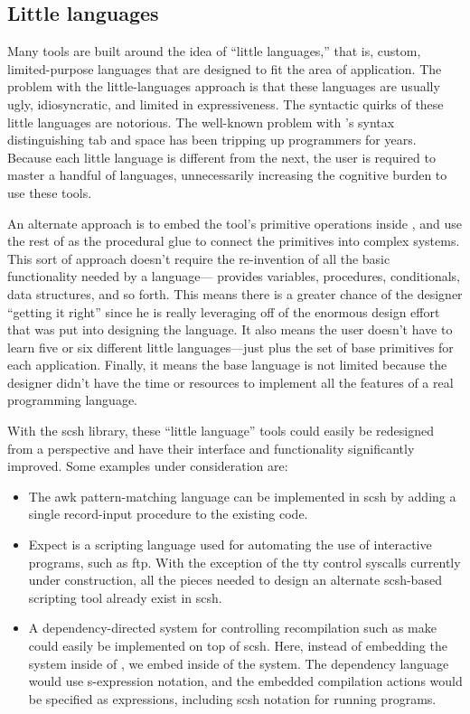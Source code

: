 \subsection{Little languages}
Many {\Unix} tools are built around the idea of ``little languages,'' that is,
custom, limited-purpose languages that are designed to fit the area of
application.  The problem with the little-languages approach is that these
languages are usually ugly, idiosyncratic, and limited in expressiveness.
The syntactic quirks of these little languages are notorious. 
The well-known problem with 's syntax distinguishing tab and
space has been tripping up programmers for years.
Because each little language is different
from the next, the user is required to master a handful of languages,
unnecessarily increasing the cognitive burden to use these tools.

An alternate approach is to embed the tool's primitive operations inside
{\Scheme},
and use the rest of {\Scheme} as the procedural glue to connect the
primitives into complex systems.  This sort of approach doesn't require the
re-invention of all the basic functionality needed by a language---{\Scheme}
provides variables, procedures, conditionals, data structures, and so
forth. This means there is a greater chance of the designer ``getting it
right'' since he is really leveraging off of the enormous design effort that
was put into designing the {\Scheme} language. It also means the user doesn't
have to learn five or six different little languages---just {\Scheme} plus the
set of base primitives for each application. Finally, it means the base
language is not limited because the designer didn't have the time or resources
to implement all the features of a real programming language.

With the scsh {\Unix} library, these ``little language'' {\Unix} tools could
easily be redesigned from a {\Scheme} perspective and have their interface and
functionality significantly improved.
Some examples under consideration are:
\begin{itemize}
\item The awk pattern-matching language can be implemented in
  scsh by adding a single record-input procedure to the existing code.

\item Expect is a scripting language used for automating the
  use of interactive programs, such as ftp. With the exception of the tty
  control syscalls currently under construction, all the pieces needed to
  design an alternate scsh-based {\Unix} scripting tool already exist in scsh.

\item A dependency-directed system for controlling recompilation such
  as make could easily be implemented on top of scsh. Here, instead of
  embedding the system inside of {\Scheme}, we embed {\Scheme} inside
  of the system. The dependency language would use s-expression notation,
  and the embedded compilation actions would be specified as {\Scheme}
  expressions, including scsh notation for running {\Unix} programs.
\end{itemize}

